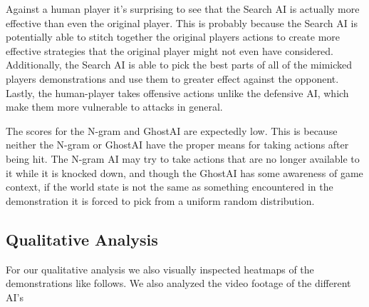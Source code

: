 Against a human player it's surprising to see that the Search AI is actually more effective than even the original player. This is probably because the Search AI is potentially able to stitch together the original players actions to create more effective strategies that the original player might not even have considered. Additionally, the Search AI is able to pick the best parts of all of the mimicked players demonstrations and use them to greater effect against the opponent. Lastly, the human-player takes offensive actions unlike the defensive AI, which make them more vulnerable to attacks in general. 

The scores for the N-gram and GhostAI are expectedly low. This is because neither the N-gram or GhostAI have the proper means for taking actions after being hit. The N-gram AI may try to take actions that are no longer available to it while it is knocked down, and though the GhostAI has some awareness of game context, if the world state is not the same as something encountered in the demonstration it is forced to pick from a uniform random distribution. 

\subsection{Qualitative Analysis}
For our qualitative analysis we also visually inspected heatmaps of the demonstrations like follows. We also analyzed the video footage of the different AI's

